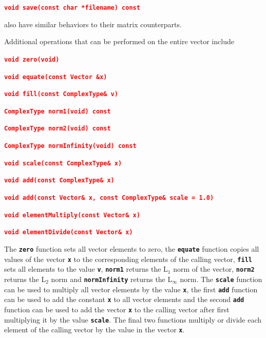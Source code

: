 \documentclass[12pt]{report} %
\begin{document}
\textcolor{red}{\texttt{\textbf{void save(const char *filename) const}}}

also have similar behaviors to their matrix counterparts.

Additional operations that can be performed on the entire vector include

\textcolor{red}{\texttt{\textbf{void zero(void)}}}

\textcolor{red}{\texttt{\textbf{void equate(const Vector \&x)}}}

\textcolor{red}{\texttt{\textbf{void fill(const ComplexType\& v)}}}

\textcolor{red}{\texttt{\textbf{ComplexType norm1(void) const}}}

\textcolor{red}{\texttt{\textbf{ComplexType norm2(void) const}}}

\textcolor{red}{\texttt{\textbf{ComplexType normInfinity(void) const}}}

\textcolor{red}{\texttt{\textbf{void scale(const ComplexType\& x)}}}

\textcolor{red}{\texttt{\textbf{void add(const ComplexType\& x)}}}

\textcolor{red}{\texttt{\textbf{void add(const Vector\& x, const ComplexType\& scale = 1.0)}}}

\textcolor{red}{\texttt{\textbf{void elementMultiply(const Vector\& x)}}}

\textcolor{red}{\texttt{\textbf{void elementDivide(const Vector\& x)}}}

\textcolor{red}{\texttt{\textbf{}}}

The \texttt{\textbf{zero}} function sets all vector elements to zero, the \texttt{\textbf{equate}} function copies all values of the vector \texttt{\textbf{x}} to the corresponding elements of the calling vector, \texttt{\textbf{fill}} sets all elements to the value \texttt{\textbf{v}}, \texttt{\textbf{norm1}} returns the L${}_{1}$ norm of the vector, \texttt{\textbf{norm2}} returns the L${}_{2}$ norm and \texttt{\textbf{normInfinity}} returns the L${}_{\mathrm{\infty }}$ norm. The \texttt{\textbf{scale}} function can be used to multiply all vector elements by the value \texttt{\textbf{x}}, the first \texttt{\textbf{add}} function can be used to add the constant \texttt{\textbf{x}} to all vector elements and the second \texttt{\textbf{add}} function can be used to add the vector \texttt{\textbf{x}} to the calling vector after first multiplying it by the value \texttt{\textbf{scale}}. The final two functions multiply or divide each element of the calling vector by the value in the vector \texttt{\textbf{x}}.
\end{document}

